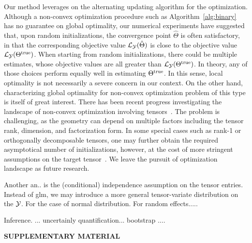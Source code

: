 \documentclass[12pt]{article}
\theoremstyle{plain}
\theoremstyle{definition}
\begin{document}
Our method leverages on the alternating updating algorithm for the optimization. Although a non-convex optimization procedure such as Algorithm~\ref{alg:binary} has no guarantee on global optimality, our numerical experiments have suggested that, upon random initializations, the convergence point $\hat\Theta$ is often satisfactory, in that the corresponding objective value $\mathcal{L}_{\mathcal{Y}}(\hat\Theta)$ is close to the objective value $\mathcal{L}_{\mathcal{Y}}(\Theta^{\text{true}})$. When starting from random initializations, there could be multiple estimates, whose objective values are all greater than $\mathcal{L}_{\mathcal{Y}}(\Theta^{\text{true}})$. In theory, any of those choices perform equally well in estimating $\Theta^{\text{true}}$. In this sense, local optimality is not necessarily a severe concern in our context. On the other hand, characterizing global optimality for non-convex optimization problem of this type is itself of great interest. There has been recent progress investigating the landscape of non-convex optimization involving tensors~\citep{anandkumar2014tensor, richard2014statistical, ge2017optimization}. The problem is challenging, as the geometry can  depend on multiple factors including the tensor rank, dimension, and factorization form. In some special cases such as rank-1 or orthogonally decomposable tensors, one may further obtain the required asymptotical number of initializations, however, at the cost of more stringent assumptions on the target tensor~\citep{anandkumar2014tensor, richard2014statistical}. We leave the pursuit of optimization landscape as future research.

Another an.. is the (conditional) independence assumption on the tensor entries. Instead of glm, we may introduce a more general tensor-variate distribution on the $\mathcal{Y}$. For the case of normal distribution. For random effects.....

Inference. ... uncertainly quantification... bootstrap .... 

 \newpage

\bigskip
\begin{center}
{\large\bf SUPPLEMENTARY MATERIAL}
\end{center}

\appendix
\end{document}
